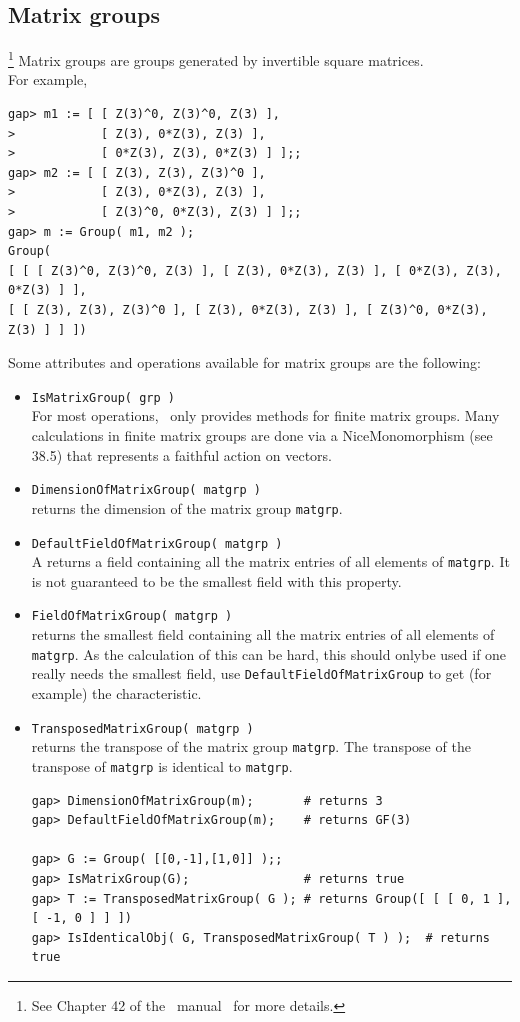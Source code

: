 \subsection{Matrix groups}\hspace{-2mm}\footnote{See Chapter 42 of the \gap\ manual~\cite{gapmanual} for more details.}
Matrix groups are groups generated by invertible square matrices.\\
For example,
{\codesize
\begin{verbatim}
gap> m1 := [ [ Z(3)^0, Z(3)^0, Z(3) ],
>            [ Z(3), 0*Z(3), Z(3) ],
>            [ 0*Z(3), Z(3), 0*Z(3) ] ];;
gap> m2 := [ [ Z(3), Z(3), Z(3)^0 ],
>            [ Z(3), 0*Z(3), Z(3) ],
>            [ Z(3)^0, 0*Z(3), Z(3) ] ];;
gap> m := Group( m1, m2 );
Group(
[ [ [ Z(3)^0, Z(3)^0, Z(3) ], [ Z(3), 0*Z(3), Z(3) ], [ 0*Z(3), Z(3), 0*Z(3) ] ],
[ [ Z(3), Z(3), Z(3)^0 ], [ Z(3), 0*Z(3), Z(3) ], [ Z(3)^0, 0*Z(3), Z(3) ] ] ])
\end{verbatim}}
\noindent Some attributes and operations available for matrix groups are the following:
\begin{itemize}
\item {\tt IsMatrixGroup( grp )}
\\[4pt]
For most operations, \gap\ only provides methods for finite matrix groups. Many calculations in finite matrix
groups are done via a NiceMonomorphism (see 38.5) that represents a faithful action on vectors.
\item {\tt DimensionOfMatrixGroup( matgrp )}\\
returns the dimension of the matrix group {\tt matgrp}.
\item {\tt DefaultFieldOfMatrixGroup( matgrp )}\\ A
returns a field containing all the matrix entries of all elements of {\tt matgrp}. 
It is not guaranteed to be the smallest field with this property.
\item {\tt FieldOfMatrixGroup( matgrp )}\\
returns the smallest field containing all the matrix entries of all elements of {\tt matgrp}. 
As the calculation of this can be hard, this should onlybe used if one really needs
the smallest field, use {\tt DefaultFieldOfMatrixGroup} to get (for example) the characteristic.
\item {\tt TransposedMatrixGroup( matgrp )}\\
returns the transpose of the matrix group {\tt matgrp}. 
The transpose of the transpose of {\tt matgrp} is identical to {\tt matgrp}.
{\codesize
\begin{verbatim}
gap> DimensionOfMatrixGroup(m);       # returns 3
gap> DefaultFieldOfMatrixGroup(m);    # returns GF(3)

gap> G := Group( [[0,-1],[1,0]] );; 
gap> IsMatrixGroup(G);                # returns true
gap> T := TransposedMatrixGroup( G ); # returns Group([ [ [ 0, 1 ], [ -1, 0 ] ] ])
gap> IsIdenticalObj( G, TransposedMatrixGroup( T ) );  # returns true

\end{verbatim}}
\end{itemize}

